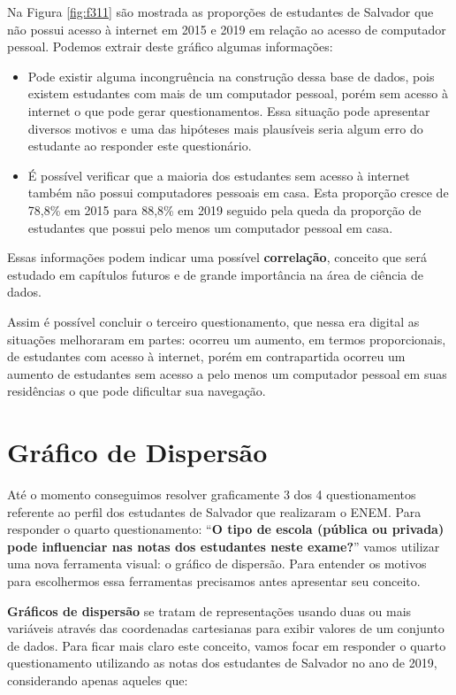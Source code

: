 \documentclass[
  oneside]{book}
\providecommand{\tightlist}{%
  \setlength{\itemsep}{0pt}\setlength{\parskip}{0pt}}
\begin{document}
Na Figura \ref{fig:f311} são mostrada as proporções de estudantes de Salvador que não possui acesso à internet em 2015 e 2019 em relação ao acesso de computador pessoal. Podemos extrair deste gráfico algumas informações:

\begin{itemize}
\tightlist
\item
  Pode existir alguma incongruência na construção dessa base de dados, pois existem estudantes com mais de um computador pessoal, porém sem acesso à internet o que pode gerar questionamentos. Essa situação pode apresentar diversos motivos e uma das hipóteses mais plausíveis seria algum erro do estudante ao responder este questionário.
\item
  É possível verificar que a maioria dos estudantes sem acesso à internet também não possui computadores pessoais em casa. Esta proporção cresce de 78,8\% em 2015 para 88,8\% em 2019 seguido pela queda da proporção de estudantes que possui pelo menos um computador pessoal em casa.
\end{itemize}

Essas informações podem indicar uma possível \textbf{correlação}, conceito que será estudado em capítulos futuros e de grande importância na área de ciência de dados.

Assim é possível concluir o terceiro questionamento, que nessa era digital as situações melhoraram em partes: ocorreu um aumento, em termos proporcionais, de estudantes com acesso à internet, porém em contrapartida ocorreu um aumento de estudantes sem acesso a pelo menos um computador pessoal em suas residências o que pode dificultar sua navegação.

\hypertarget{gdisp}{%
\section{Gráfico de Dispersão}\label{gdisp}}

Até o momento conseguimos resolver graficamente 3 dos 4 questionamentos referente ao perfil dos estudantes de Salvador que realizaram o ENEM. Para responder o quarto questionamento: ``\textbf{O tipo de escola (pública ou privada) pode influenciar nas notas dos estudantes neste exame?}'' vamos utilizar uma nova ferramenta visual: o gráfico de dispersão. Para entender os motivos para escolhermos essa ferramentas precisamos antes apresentar seu conceito.

\textbf{Gráficos de dispersão} se tratam de representações usando duas ou mais variáveis através das coordenadas cartesianas para exibir valores de um conjunto de dados. Para ficar mais claro este conceito, vamos focar em responder o quarto questionamento utilizando as notas dos estudantes de Salvador no ano de 2019, considerando apenas aqueles que:
\end{document}
